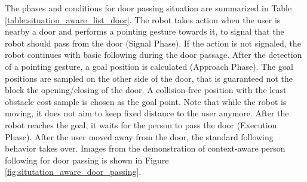\documentclass{tADR2e}
\begin{document}
The phases and conditions for door passing situation are summarized in Table \ref{table:situation_aware_list_door}. The robot takes action when the user is nearby a door and performs a pointing gesture towards it, to signal that the robot should pass from the door (Signal Phase). If the action is not signaled, the robot continues with basic following during the door passage. After the detection of a pointing gesture, a goal position is calculated (Approach Phase). The goal positions are sampled on the other side of the door, that is guaranteed not the block the opening/closing of the door. A collision-free position with the least obstacle cost sample is chosen as the goal point. Note that while the robot is moving, it does not aim to keep fixed distance to the user anymore. After the robot reaches the goal, it waits for the person to pass the door (Execution Phase). After the user moved away from the door, the standard following behavior takes over. Images from the demonstration of context-aware person following for door passing is shown in Figure \ref{fig:situtation_aware_door_passing}.
\end{document}
